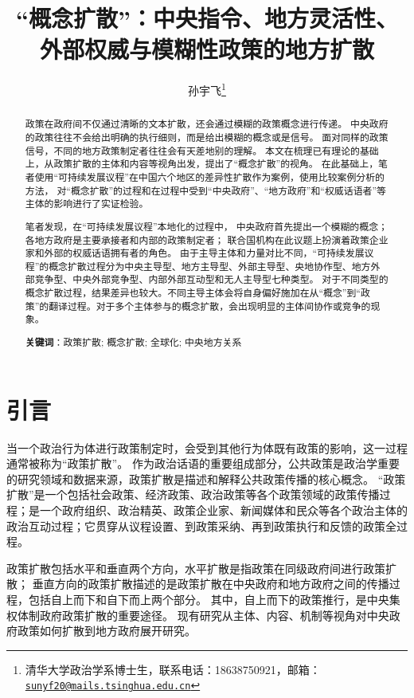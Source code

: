 \documentclass[
  12pt,
]{ctexart}
\title{``概念扩散''：中央指令、地方灵活性、外部权威与模糊性政策的地方扩散}
\author{孙宇飞\footnote{清华大学政治学系博士生，联系电话：18638750921，邮箱：\href{mailto:sunyf20@mails.tsinghua.edu.cn}{\nolinkurl{sunyf20@mails.tsinghua.edu.cn}}}}
\date{}
\begin{document}
\maketitle
\begin{abstract}
政策在政府间不仅通过清晰的文本扩散，还会通过模糊的政策概念进行传递。
中央政府的政策往往不会给出明确的执行细则，而是给出模糊的概念或是信号。
面对同样的政策信号，不同的地方政策制定者往往会有天差地别的理解。
本文在梳理已有理论的基础上，从政策扩散的主体和内容等视角出发，提出了``概念扩散''的视角。
在此基础上，笔者使用``可持续发展议程''在中国六个地区的差异性扩散作为案例，使用比较案例分析的方法，
对``概念扩散''的过程和在过程中受到``中央政府''、``地方政府''和``权威话语者''等主体的影响进行了实证检验。

笔者发现，在``可持续发展议程''本地化的过程中，
中央政府首先提出一个模糊的概念；
各地方政府是主要承接者和内部的政策制定者；
联合国机构在此议题上扮演着政策企业家和外部的权威话语拥有者的角色。
由于主导主体和力量对比不同，``可持续发展议程''的概念扩散过程分为中央主导型、地方主导型、外部主导型、央地协作型、地方外部竞争型、中央外部竞争型、内部外部互动型和无人主导型七种类型。
对于不同类型的概念扩散过程，结果差异也较大。不同主导主体会将自身偏好施加在从``概念''到``政策''的翻译过程。对于多个主体参与的概念扩散，会出现明显的主体间协作或竞争的现象。

\textbf{关键词}：政策扩散; 概念扩散; 全球化; 中央地方关系
\end{abstract}

\newpage

\hypertarget{ux5f15ux8a00}{%
\section{引言}\label{ux5f15ux8a00}}

当一个政治行为体进行政策制定时，会受到其他行为体既有政策的影响，这一过程通常被称为``政策扩散''。
作为政治话语的重要组成部分，公共政策是政治学重要的研究领域和数据来源，政策扩散是描述和解释公共政策传播的核心概念。
``政策扩散''是一个包括社会政策、经济政策、政治政策等各个政策领域的政策传播过程；是一个政府组织、政治精英、政策企业家、新闻媒体和民众等各个政治主体的政治互动过程；它贯穿从议程设置、到政策采纳、再到政策执行和反馈的政策全过程。

政策扩散包括水平和垂直两个方向，水平扩散是指政策在同级政府间进行政策扩散；
垂直方向的政策扩散描述的是政策扩散在中央政府和地方政府之间的传播过程，包括自上而下和自下而上两个部分。
其中，自上而下的政策推行，是中央集权体制政府政策扩散的重要途径。
现有研究从主体、内容、机制等视角对中央政府政策如何扩散到地方政府展开研究。
\end{document}
